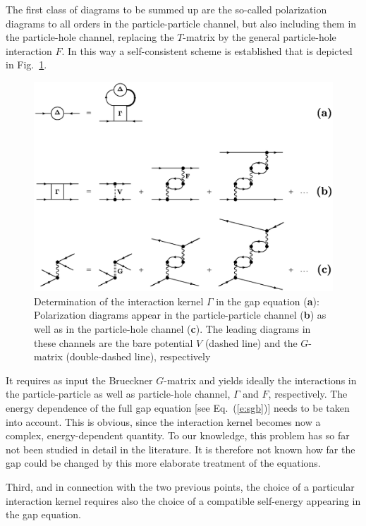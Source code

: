 \documentclass{svmult}
\begin{document}
The first class of diagrams to be summed up are the so-called 
polarization diagrams to all orders in the 
particle-particle channel, but also including them in the particle-hole
channel, replacing the $T$-matrix by the general particle-hole
interaction $F$.
In this way a self-consistent scheme is established that is depicted 
in Fig.~\ref{f:pol}.
\begin{figure}[h] %
\includegraphics[height=0.45\textheight,bb=-0 410 -0 820]{nsbk_pic.ps}
\caption[]{
Determination of the interaction kernel $\Gamma$ in the gap equation ({\bf a}):
Polarization diagrams appear in the particle-particle channel ({\bf b}) 
as well as in the particle-hole channel ({\bf c}).
The leading diagrams in these channels   
are the bare potential $V$ (dashed line) and the $G$-matrix (double-dashed
line), respectively}
\label{f:pol}
\end{figure} %
It requires as input the Brueckner $G$-matrix and yields ideally the
interactions in the particle-particle as well as particle-hole channel,
$\Gamma$ and $F$, respectively.
The energy dependence 
of the full gap equation [see Eq.~(\ref{e:sgb})] needs to be 
taken into account.
This is obvious, since the interaction kernel becomes now a complex,
energy-dependent quantity.
To our knowledge, this problem has so far not been studied in detail 
in the literature. 
It is therefore not known how far the gap could be changed by this
more elaborate treatment of the equations.

Third, and in connection with the two previous points,
the choice of a particular interaction kernel 
requires also the choice of a compatible self-energy appearing in the 
gap equation.
\end{document}
